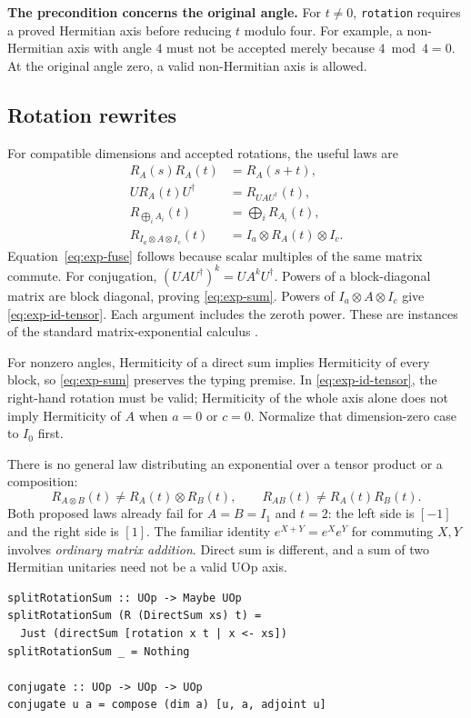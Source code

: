 \documentclass[11pt,a4paper]{article}
\newcommand{\code}[1]{\texttt{#1}}
\newcommand{\Rot}[2]{R_{#1}(#2)}
\begin{document}
\textbf{The precondition concerns the original angle.}
For $t\ne0$, \code{rotation} requires a proved Hermitian axis before
reducing $t$ modulo four. For example, a non-Hermitian axis with angle
$4$ must not be accepted merely because $4\bmod4=0$.
At the original angle zero, a valid non-Hermitian axis is allowed.

\subsection{Rotation rewrites}

For compatible dimensions and accepted rotations, the useful laws are
\begin{align}
 \Rot As\Rot At&=\Rot A{s+t}, \label{eq:exp-fuse}\\
 U\Rot At U^\dagger&=\Rot{UAU^\dagger}t, \label{eq:exp-conjugate}\\
 \Rot{\bigoplus_i A_i}t&=\bigoplus_i\Rot{A_i}t,
       \label{eq:exp-sum}\\
 \Rot{I_a\otimes A\otimes I_c}t
     &=I_a\otimes\Rot At\otimes I_c. \label{eq:exp-id-tensor}
\end{align}
Equation~\eqref{eq:exp-fuse} follows because scalar multiples of the same
matrix commute. For conjugation, $(UAU^\dagger)^k=UA^kU^\dagger$.
Powers of a block-diagonal matrix are block diagonal, proving
\eqref{eq:exp-sum}. Powers of $I_a\otimes A\otimes I_c$ give
\eqref{eq:exp-id-tensor}. Each argument includes the zeroth power.
These are instances of the standard matrix-exponential calculus
\cite{higham-exp}.

For nonzero angles, Hermiticity of a direct sum implies Hermiticity of
every block, so \eqref{eq:exp-sum} preserves the typing premise.
In \eqref{eq:exp-id-tensor}, the right-hand rotation must be valid;
Hermiticity of the whole axis alone does not imply Hermiticity of $A$
when $a=0$ or $c=0$. Normalize that dimension-zero case to $I_0$ first.

There is no general law distributing an exponential over a tensor
product or a composition:
\[
 \Rot{A\otimes B}t\ne\Rot At\otimes\Rot Bt,
 \qquad
 \Rot{AB}t\ne\Rot At\Rot Bt.
\]
Both proposed laws already fail for $A=B=I_1$ and $t=2$: the left side
is $[-1]$ and the right side is $[1]$.
The familiar identity $e^{X+Y}=e^Xe^Y$ for commuting $X,Y$ involves
\emph{ordinary matrix addition}. Direct sum is different, and a sum of
two Hermitian unitaries need not be a valid UOp axis.

\begin{lstlisting}
splitRotationSum :: UOp -> Maybe UOp
splitRotationSum (R (DirectSum xs) t) =
  Just (directSum [rotation x t | x <- xs])
splitRotationSum _ = Nothing

conjugate :: UOp -> UOp -> UOp
conjugate u a = compose (dim a) [u, a, adjoint u]
\end{lstlisting}
\end{document}
